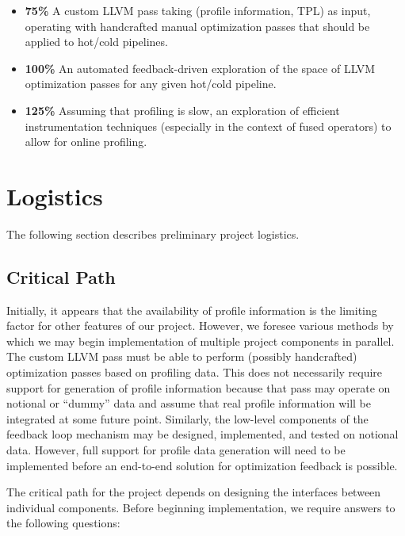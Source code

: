\documentclass{vldb}
\begin{document}
\begin{itemize}
    \item \textbf{75\%} A custom LLVM pass taking (profile information, TPL) as input, operating with handcrafted manual optimization passes that should be applied to hot/cold pipelines.
    \item \textbf{100\%} An automated feedback-driven exploration of the space of LLVM optimization passes for any given hot/cold pipeline.
    \item \textbf{125\%} Assuming that profiling is slow, an exploration of efficient instrumentation techniques (especially in the context of fused operators) to allow for online profiling.
\end{itemize}


\section{Logistics}

The following section describes preliminary project logistics.

\subsection{Critical Path}

Initially, it appears that the availability of profile information is the limiting factor for other features of our project. However, we foresee various methods by which we may begin implementation of multiple project components in parallel. The custom LLVM pass must be able to perform (possibly handcrafted) optimization passes based on profiling data. This does not necessarily require support for generation of profile information because that pass may operate on notional or “dummy” data and assume that real profile information will be integrated at some future point. Similarly, the low-level components of the feedback loop mechanism may be designed, implemented, and tested on notional data. However, full support for profile data generation will need to be implemented before an end-to-end solution for optimization feedback is possible.

The critical path for the project depends on designing the interfaces between individual components. Before beginning implementation, we require answers to the following questions:
\end{document}
